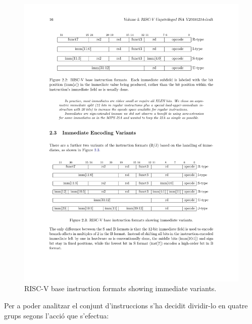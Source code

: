 \documentclass[10pt,a4paper,twocolumn,twoside]{article}
\begin{document}
    \begin{figure}[!h]
    \centering
    	\includegraphics[width=\linewidth]{pdf/Encoding.pdf}
        \caption{RISC-V base instruction formats showing immediate variants.}
        \label{fig:baseinstformatsimm}
    \end{figure}
    
    Per a poder analitzar el conjunt d'instruccions s'ha decidit dividir-lo en quatre grups segons l'acció que s'efectua:
    
\end{document}
